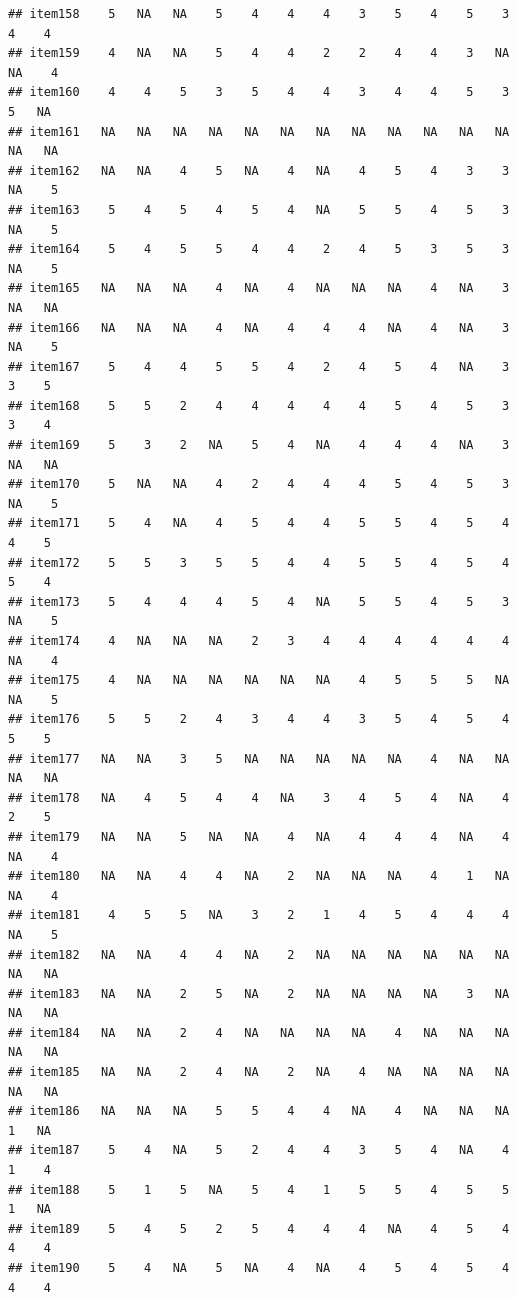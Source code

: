 \documentclass[
  man]{apa6}
\begin{document}
\begin{verbatim}
## item158    5   NA   NA    5    4    4    4    3    5    4    5    3    4    4
## item159    4   NA   NA    5    4    4    2    2    4    4    3   NA   NA    4
## item160    4    4    5    3    5    4    4    3    4    4    5    3    5   NA
## item161   NA   NA   NA   NA   NA   NA   NA   NA   NA   NA   NA   NA   NA   NA
## item162   NA   NA    4    5   NA    4   NA    4    5    4    3    3   NA    5
## item163    5    4    5    4    5    4   NA    5    5    4    5    3   NA    5
## item164    5    4    5    5    4    4    2    4    5    3    5    3   NA    5
## item165   NA   NA   NA    4   NA    4   NA   NA   NA    4   NA    3   NA   NA
## item166   NA   NA   NA    4   NA    4    4    4   NA    4   NA    3   NA    5
## item167    5    4    4    5    5    4    2    4    5    4   NA    3    3    5
## item168    5    5    2    4    4    4    4    4    5    4    5    3    3    4
## item169    5    3    2   NA    5    4   NA    4    4    4   NA    3   NA   NA
## item170    5   NA   NA    4    2    4    4    4    5    4    5    3   NA    5
## item171    5    4   NA    4    5    4    4    5    5    4    5    4    4    5
## item172    5    5    3    5    5    4    4    5    5    4    5    4    5    4
## item173    5    4    4    4    5    4   NA    5    5    4    5    3   NA    5
## item174    4   NA   NA   NA    2    3    4    4    4    4    4    4   NA    4
## item175    4   NA   NA   NA   NA   NA   NA    4    5    5    5   NA   NA    5
## item176    5    5    2    4    3    4    4    3    5    4    5    4    5    5
## item177   NA   NA    3    5   NA   NA   NA   NA   NA    4   NA   NA   NA   NA
## item178   NA    4    5    4    4   NA    3    4    5    4   NA    4    2    5
## item179   NA   NA    5   NA   NA    4   NA    4    4    4   NA    4   NA    4
## item180   NA   NA    4    4   NA    2   NA   NA   NA    4    1   NA   NA    4
## item181    4    5    5   NA    3    2    1    4    5    4    4    4   NA    5
## item182   NA   NA    4    4   NA    2   NA   NA   NA   NA   NA   NA   NA   NA
## item183   NA   NA    2    5   NA    2   NA   NA   NA   NA    3   NA   NA   NA
## item184   NA   NA    2    4   NA   NA   NA   NA    4   NA   NA   NA   NA   NA
## item185   NA   NA    2    4   NA    2   NA    4   NA   NA   NA   NA   NA   NA
## item186   NA   NA   NA    5    5    4    4   NA    4   NA   NA   NA    1   NA
## item187    5    4   NA    5    2    4    4    3    5    4   NA    4    1    4
## item188    5    1    5   NA    5    4    1    5    5    4    5    5    1   NA
## item189    5    4    5    2    5    4    4    4   NA    4    5    4    4    4
## item190    5    4   NA    5   NA    4   NA    4    5    4    5    4    4    4

\end{verbatim}
\end{document}
